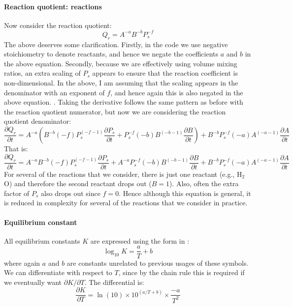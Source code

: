 \paragraph{Reaction quotient: reactions}
Now consider the reaction quotient:
\begin{equation}
Q_r = A^{-a} B^{-b} P_s^{-f}
\end{equation}
The above deserves some clarification.  Firstly, in the code we use negative stoichiometry to denote reactants, and hence we negate the coefficients $a$ and $b$ in the above equation.  Secondly, because we are effectively using volume mixing ratios, an extra scaling of $P_s$ appears to ensure that the reaction coefficient is non-dimensional.  In the above, I am assuming that the scaling appears in the denominator with an exponent of $f$, and hence again this is also negated in the above equation.  .  Taking the derivative follows the same pattern as before with the reaction quotient numerator, but now we are considering the reaction quotient denominator:
\begin{equation}
\frac{\partial Q_r}{\partial t} = A^{-a} \left( B^{-b}(-f)P_s^{(-f-1)} \frac{\partial P_s}{\partial t} + P_s^{-f} (-b)B^{(-b-1)} \frac{\partial B}{\partial t} \right) + B^{-b} P_s^{-f} (-a) A^{(-a-1)} \frac{\partial A}{\partial t}
\end{equation}
That is:
\begin{equation}
\frac{\partial Q_r}{\partial t} = A^{-a} B^{-b}(-f)P_s^{(-f-1)} \frac{\partial P_s}{\partial t} + A^{-a} P_s^{-f} (-b)B^{(-b-1)} \frac{\partial B}{\partial t} + B^{-b} P_s^{-f} (-a) A^{(-a-1)} \frac{\partial A}{\partial t}
\end{equation}
For several of the reactions that we consider, there is just one reactant (e.g., H$_2$O) and therefore the second reactant drops out ($B=1$).  Also, often the extra factor of $P_s$ also drops out since $f=0$.  Hence although this equation is general, it is reduced in complexity for several of the reactions that we consider in practice.
\paragraph{Equilibrium constant}
All equilibrium constants $K$ are expressed using the form in \cite{SF17}:
\begin{equation}
\log_{10} K = \frac{a}{T} + b
\end{equation}
where again $a$ and $b$ are constants unrelated to previous usages of these symbols.  We can differentiate with respect to $T$, since by the chain rule this is required if we eventually want $\partial K/\partial T$.  The differential is:
\begin{equation}
\frac{\partial K}{\partial T} = \ln(10) \times 10^{(a/T+b)} \times \frac{-a}{T^2}
\end{equation}
